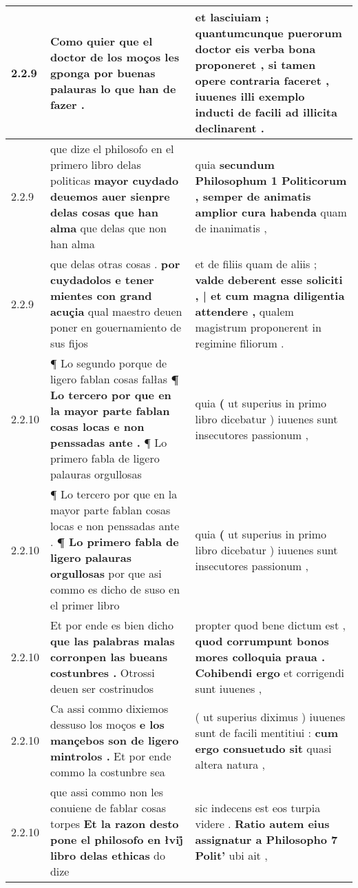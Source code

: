 \begin{tabular}{|p{1cm}|p{6.5cm}|p{6.5cm}|}
2.2.9 & Como quier que el doctor de los moços les gponga \textbf{ por buenas palauras } lo que han de fazer . & et lasciuiam ; \textbf{ quantumcunque puerorum doctor eis verba bona proponeret , } si tamen opere contraria faceret , iuuenes illi exemplo inducti de facili ad illicita declinarent . \\\hline
2.2.9 & que dize el philosofo en el primero libro delas politicas \textbf{ mayor cuydado deuemos auer sienpre delas cosas que han alma } que delas que non han alma & quia \textbf{ secundum Philosophum 1 Politicorum , semper de animatis amplior cura habenda } quam de inanimatis , \\\hline
2.2.9 & que delas otras cosas . \textbf{ por cuydadolos e tener mientes con grand acuçia } qual maestro deuen poner en gouernamiento de sus fijos & et de filiis quam de aliis ; \textbf{ valde deberent esse soliciti , | et cum magna diligentia attendere , } qualem magistrum proponerent in regimine filiorum . \\\hline
2.2.10 & ¶ Lo segundo porque de ligero fablan cosas falłas \textbf{ ¶ Lo tercero por que en la mayor parte fablan cosas locas e non penssadas ante . } ¶ Lo primero fabla de ligero palauras orgullosas & quia \textbf{ ( } ut superius in primo libro dicebatur ) iuuenes sunt insecutores passionum , \\\hline
2.2.10 & ¶ Lo tercero por que en la mayor parte fablan cosas locas e non penssadas ante . \textbf{ ¶ Lo primero fabla de ligero palauras orgullosas } por que asi commo es dicho de suso en el primer libro & quia \textbf{ ( } ut superius in primo libro dicebatur ) iuuenes sunt insecutores passionum , \\\hline
2.2.10 & Et por ende es bien dicho \textbf{ que las palabras malas corronpen las bueans costunbres . } Otrossi deuen ser costrinudos & propter quod bene dictum est , \textbf{ quod corrumpunt bonos mores colloquia praua . Cohibendi ergo } et corrigendi sunt iuuenes , \\\hline
2.2.10 & Ca assi commo dixiemos dessuso los moços \textbf{ e los mançebos son de ligero mintrolos . } Et por ende commo la costunbre sea & ( ut superius diximus ) iuuenes sunt de facili mentitiui : \textbf{ cum ergo consuetudo sit } quasi altera natura , \\\hline
2.2.10 & que assi commo non les conuiene de fablar cosas torpes \textbf{ Et la razon desto pone el philosofo en łvij̊ libro delas ethicas } do dize & sic indecens est eos turpia videre . \textbf{ Ratio autem eius assignatur a Philosopho 7 Polit’ } ubi ait , \\\hline

\end{tabular}

